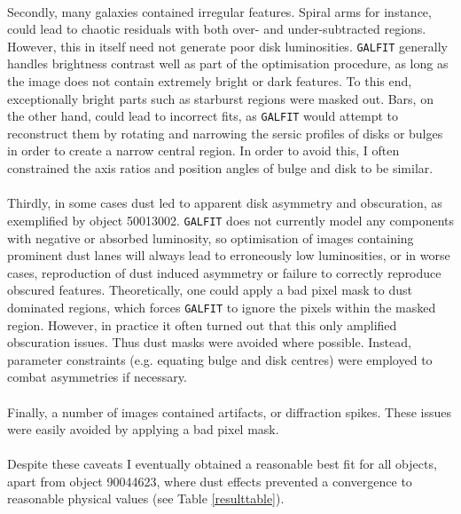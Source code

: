 \documentclass[11pt,twocolumn]{article}
\begin{document}
\paragraph{} Secondly, many galaxies contained irregular features. Spiral arms for instance, could lead to chaotic residuals with both over- and under-subtracted regions. However, this in itself need not generate poor disk luminosities. {\tt GALFIT} generally handles brightness contrast well as part of the optimisation procedure, as long as the image does not contain extremely bright or dark features. To this end, exceptionally bright parts such as starburst regions were masked out. Bars, on the other hand, could lead to incorrect fits, as {\tt GALFIT} would attempt to reconstruct them by rotating and  narrowing the sersic profiles of disks or bulges in order to create a narrow central region. In order to avoid this, I often constrained the axis ratios and position angles of bulge and disk to be similar.
\paragraph{} Thirdly, in some cases dust led to apparent disk asymmetry and obscuration, as exemplified by object 50013002. {\tt GALFIT} does not currently model any components with negative or absorbed luminosity, so optimisation of images containing prominent dust lanes will always lead to erroneously low luminosities, or in worse cases, reproduction of dust induced asymmetry or failure to correctly reproduce obscured features. Theoretically, one could apply a bad pixel mask to dust dominated regions, which forces {\tt GALFIT} to ignore the pixels within the masked region. However, in practice it often turned out that this only amplified obscuration issues. Thus dust masks were avoided where possible. Instead, parameter constraints (e.g. equating bulge and disk centres) were employed to combat asymmetries if necessary. 
\paragraph{} Finally, a number of images contained artifacts, or diffraction spikes. These issues were easily avoided by applying a bad pixel mask.  
\paragraph{} 
Despite these caveats I eventually obtained a reasonable best fit for all objects, apart from object 90044623, where dust effects prevented a convergence to reasonable physical values (see Table \ref{resulttable}).
\end{document}
